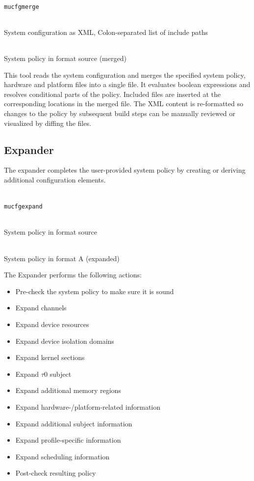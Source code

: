 \documentclass[a4paper,twoside,titlepage]{article}
\begin{document}
\begin{description} \itemsep1pt \parskip0pt
	\item[Name] \hfill \\
		\texttt{mucfgmerge}
	\item[Input] \hfill \\
		System configuration as XML, Colon-separated list of include paths
	\item[Output] \hfill \\
		System policy in format source (merged)
\end{description}

This tool reads the system configuration and merges the specified system
policy, hardware and platform files into a single file. It evaluates boolean
expressions and resolves conditional parts of the policy. Included files are
inserted at the corresponding locations in the merged file. The XML content is
re-formatted so changes to the policy by subsequent build steps can be manually
reviewed or visualized by diffing the files.

\subsection{Expander}
\label{sec:tools-expander}
The expander completes the user-provided system policy by creating or deriving
additional configuration elements.

\begin{description} \itemsep1pt \parskip0pt
	\item[Name] \hfill \\
		\texttt{mucfgexpand}
	\item[Input] \hfill \\
		System policy in format source
	\item[Output] \hfill \\
		System policy in format A (expanded)
\end{description}

The Expander performs the following actions:
\begin{itemize}
	\item Pre-check the system policy to make sure it is sound
	\item Expand channels
	\item Expand device resources
	\item Expand device isolation domains
	\item Expand kernel sections
	\item Expand $\tau$0 subject
	\item Expand additional memory regions
	\item Expand hardware-/platform-related information
	\item Expand additional subject information
	\item Expand profile-specific information
	\item Expand scheduling information
	\item Post-check resulting policy
\end{itemize}
\end{document}

